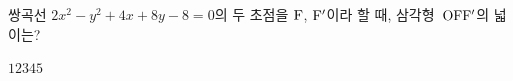 쌍곡선 $2x^2-y^2+4x+8y-8=0$의 두 초점을 $\mathrm{F}$, $\mathrm{F'}$이라 할 때, 삼각형~$\mathrm{OFF'}$의 넓이는? 
\begin{choices32}{$1$}{$2$}{$3$}{$4$}{$5$}\end{choices32}
